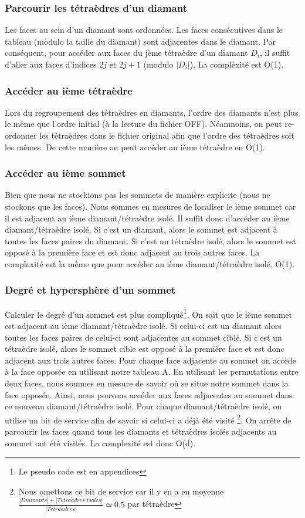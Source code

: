 \subsubsection{Parcourir les tétraèdres d'un diamant}
\noindent
Les faces au sein d'un diamant sont ordonnées. Les faces consécutives dans le tableau (modulo la taille du diamant) sont adjacentes dans le diamant. Par conséquent, pour accéder aux faces du jème tétraèdre d'un diamant $D_i$, il suffit d'aller aux faces d'indices $2j$ et $2j+1$ (modulo $|D_i|$). La compléxité est O(1).
\subsubsection{Accéder au ième tétraèdre}
\noindent
Lors du regroupement des tétraèdres en diamants, l'ordre des diamants n'est plus le même que l'ordre initial (à la lecture du fichier OFF). Néanmoins, on peut re-ordonner les tétraèdres dans le fichier original afin que l'ordre des tétraèdres soit les mêmes. De cette manière on peut accéder au ième tétraèdre en O(1).
\subsubsection{Accéder au ième sommet}
\noindent
Bien que nous ne stockions pas les sommets de manière explicite (nous ne stockons que les faces). Nous sommes en mesures de localiser le ième sommet car il est adjacent au ième diamant/tétraèdre isolé.
Il suffit donc d'accéder au ième diamant/tétraèdre isolé. Si c'est un diamant, alors le sommet est adjacent à toutes les faces paires du diamant. Si c'est un tétraèdre isolé, alors le sommet est opposé à la première face et est donc adjacent au trois autres faces. La complexité est la même que pour accéder au ième diamant/tétraèdre isolé, O(1).
\subsubsection{Degré et hypersphère d'un sommet}
\noindent
Calculer le degré d'un sommet est plus compliqué\footnote{Le pseudo code est en appendices}. On sait que le ième sommet est adjacent au ième diamant/tétraèdre isolé. Si celui-ci est un diamant alors toutes les faces paires de celui-ci sont adjacentes au sommet ciblé. Si c'est un tétraèdre isolé, alors le sommet cible est opposé à la première face et est donc adjacent aux trois autres faces. Pour chaque face adjacente au sommet on accède à la face opposée en utilisant notre tableau A. En utilisant les permutations entre deux faces, nous sommes en mesure de savoir où se situe notre sommet dans la face opposée. Ainsi, nous pouvons accéder aux faces adjacentes au sommet dans ce nouveau diamant/tétraèdre isolé. Pour chaque diamant/tétraèdre isolé, on utilise un bit de service afin de savoir si celui-ci a déjà été visité \footnote{Nous omettons ce bit de service car il y en a en moyenne $\frac{|Diamants| + |T\acute{e}tra\grave{a}dres \; isol\acute{e}s|}{|T\acute{e}tra\grave{a}dres|}\simeq 0.5$ par tétraèdre}. On arrête de parcourir les faces quand tous les diamants et tétraèdres isolés adjacents au sommet ont été visités. La complexité est donc O(d).
